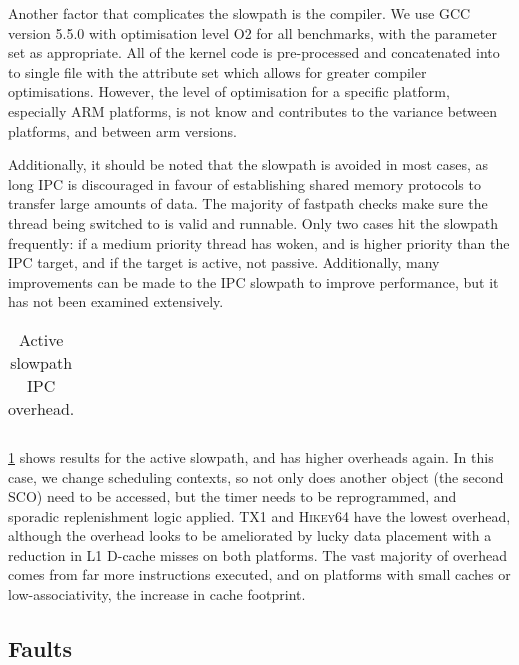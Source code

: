 Another factor that complicates the slowpath is the compiler. We use GCC version 5.5.0 with optimisation
level O2 for all benchmarks, with the  parameter set as appropriate. All of the kernel
code is pre-processed and concatenated into to single file with the  attribute
set which allows for greater compiler optimisations. However, the level of optimisation for a
specific platform, especially ARM platforms, is not know and contributes to the variance between
platforms, and between arm versions.

Additionally, it should be noted that the slowpath is avoided in most cases, as long IPC is discouraged in
favour of establishing shared memory protocols to transfer large amounts of data. The majority of
fastpath checks make sure the thread being switched to is valid and runnable. Only two cases hit the
slowpath frequently: if a medium priority thread has woken, and is higher priority than the
\gls{IPC} target, and if the target is active, not passive. 
Additionally, many improvements can be made to the \gls{IPC} slowpath to improve
performance, but it has not been examined extensively.

\begin{table}[t]\centering
    \begin{tabularx}{\textwidth}{Xlllllll}\toprule
        
        \bottomrule
    \end{tabularx}
\caption{Active slowpath IPC overhead.}
\label{t:slowpath-ipc-micro-active}
\end{table}


\cref{t:slowpath-ipc-micro-active} shows results for the active slowpath, and has higher overheads
again. In this case, we change scheduling
contexts, so not only does another object (the second \gls{SCO}) need to be accessed, but the timer
needs to be reprogrammed, and sporadic replenishment logic applied. \textsc{TX1} and
\textsc{Hikey64} have the lowest overhead, although the overhead looks to be ameliorated by lucky
data placement with a reduction in L1 D-cache misses on both platforms. The vast majority of
overhead comes from far more instructions executed, and on platforms with small caches or
low-associativity, the increase in cache footprint.  


\subsection{Faults}

